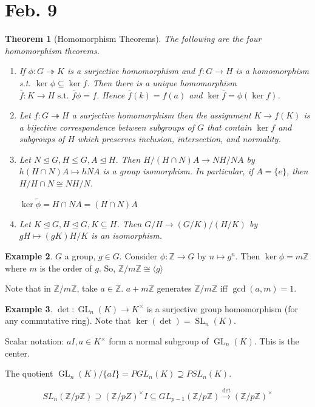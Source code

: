 \documentclass{amsart}
\newtheorem{thm}{Theorem}[section]
\theoremstyle{definition}
\newtheorem{example}[thm]{Example}
\newcommand{\Z}{\mathbb Z}
\newcommand{\st}{\text{ s.t. }}
\DeclareMathOperator{\GL}{GL}
\DeclareMathOperator{\SL}{SL}
\begin{document}
\section{Feb. 9}
\begin{thm}[Homomorphism Theorems]
The following are the four homomorphism theorems.
\begin{enumerate}
	\item {} If $\phi:G\twoheadrightarrow K$ is a surjective homomorphism and $f:G\to H$ is a homomorphism s.t. $\ker\phi\subseteq\ker f$. Then there is a unique homomorphism $\bar f:K\to H\st \bar f\phi=f$. Hence $\bar f(k)=f(a)$ and $\ker\bar f=\phi(\ker f)$.
	\item Let $f:G\twoheadrightarrow H$ a surjective homomorphism then the assignment $K\to f(K)$ is a bijective correspondence between subgroups of $G$ that contain $\ker f$ and subgroups of $H$ which preserves inclusion, intersection, and normality.
	\item Let $N\unlhd G, H\leq G, A\unlhd H$. Then $H/(H\cap N)A\to NH/NA$ by $h(H\cap N)A\mapsto hNA$ is a group isomorphism. In particular, if $A=\{e\}$, then $H/H\cap N\cong NH/N$.
\begin{center}
	 $\ker\widetilde\phi=H\cap NA=(H\cap N)A$
\end{center}
\item Let $K\unlhd G, H\unlhd G, K\subseteq H$. Then $G/H\to (G/K)/(H/K)$ by $gH\mapsto (gK)H/K$ is an isomorphism.
\end{enumerate}
\end{thm}
\begin{example}
	$G$ a group, $g\in G$. Consider $\phi: \Z\to G$ by $n\mapsto g^n$. Then $\ker\phi=m\Z$ where $m$ is the order of $g$. So, $\Z/m\Z\cong \langle g\rangle$
	
	Note that in $\Z/m\Z$, take $a\in \Z$. $a+m\Z$ generates $\Z/m\Z$ iff $\gcd(a,m)=1$.
\end{example}
\begin{example}
	$\det:\GL_n(K)\to K^\times$ is a surjective group homomorphism (for any commutative ring). Note that $\ker(\det)=\SL_n(K)$.
	
	Scalar notation: $aI, a\in K^\times$ form a normal subgroup of $\GL_n(K)$. This is the center.
	
	The quotient $\GL_n(K)/\{aI\}=PGL_n(K)\supseteq PSL_n(K)$.
	
	$$SL_n(\Z/p\Z)\supseteq (\Z/pZ)^\times I\subseteq GL_{p-1}(\Z/p\Z)\overset{\det}\to(\Z/p\Z)^\times$$ 
\end{example}
\end{document}
